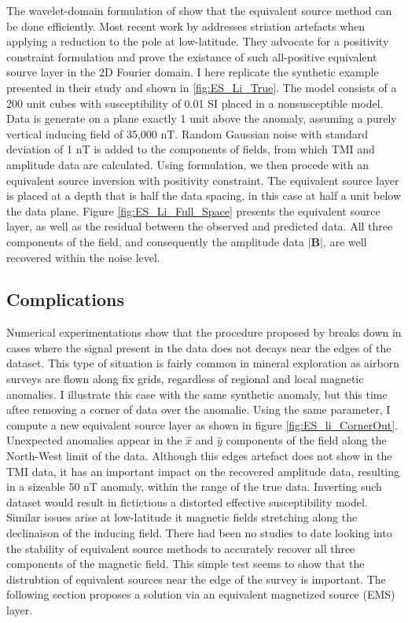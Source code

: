 The wavelet-domain formulation of \cite{LiOldenburg10} show that the equivalent source method can be done efficiently.
Most recent work by \cite{LiNabighian14} addresses striation artefacts when applying a reduction to the pole at low-latitude. They advocate for a positivity constraint formulation and prove the existance of such all-positive equivalent sourve layer in the 2D Fourier domain.
I here replicate the synthetic example presented in their study and shown in \ref{fig:ES_Li_True}. 
The model consists of a 200 unit cubes with susceptibility of 0.01 SI placed in a nonsusceptible model. Data is generate on a plane exactly 1 unit above the anomaly, assuming a purely vertical inducing field of 35,000 nT. Random Gaussian noise with standard deviation of 1 nT is added to the components of fields, from which TMI and amplitude data are calculated.
Using \cite{LiNabighian14} formulation, we then procede with an equivalent source inversion with positivity constraint. 
The equivalent source layer is placed at a depth that is half the data spacing, in this case at half a unit below the data plane.
Figure \ref{fig:ES_Li_Full_Space} presents the equivalent source layer, as well as the residual between the observed and predicted data. 
All three components of the field, and consequently the amplitude data $\mathbf{|B|}$, are well recovered within the noise level. 

\subsection{Complications}
Numerical experimentations show that the procedure proposed by \cite{LiNabighian14} breaks down in cases where the signal present in the data does not decays near the edges of the dataset. 
This type of situation is fairly common in mineral exploration as airborn surveys are flown along fix grids, regardless of regional and local magnetic anomalies. 
I illustrate this case with the same synthetic anomaly, but this time aftee removing a corner of data over the anomalie. 
Using the same parameter, I compute a new equivalent source layer as shown in figure \ref{fig:ES_li_CornerOut}.  
Unexpected anomalies appear in the $\hat x$ and  $\hat y$ components of the field along the North-West limit of the data. 
Although this edges artefact does not show in the TMI data, it has an important impact on the recovered amplitude data, resulting in a 
sizeable 50 nT anomaly, within the range of the true data.
Inverting such dataset would result in fictictious a distorted effective susceptibility model.
Similar issues arise at low-latitude it magnetic fields stretching along the declinaison of the inducing field.
There had been no studies to date looking into the stability of equivalent source methods to accurately recover all three components of the magnetic field.
This simple test seems to show that the distrubtion of equivalent sources near the edge of the survey is important. 
The following section proposes a solution via an equivalent magnetized source (EMS) layer.
  
